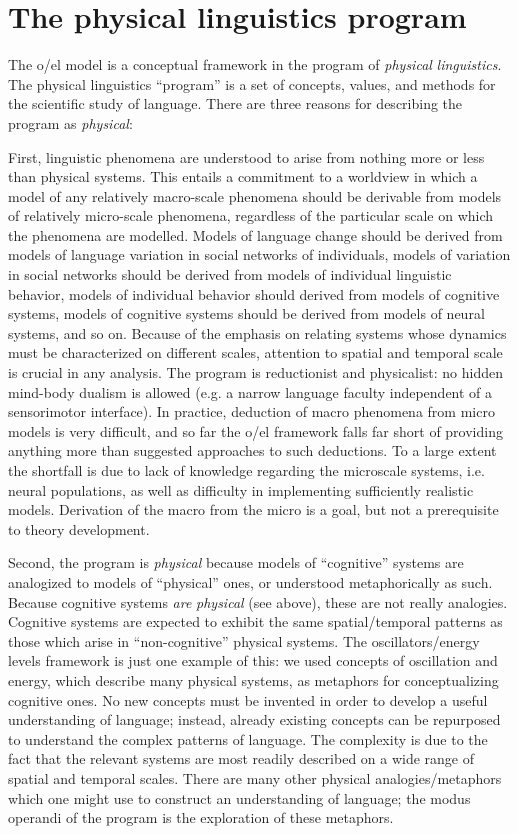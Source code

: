 \chapter{The physical linguistics program}

The o/el model is a conceptual framework in the program of \textit{physical} \textit{linguistics}. The physical linguistics “program” is a set of concepts, values, and methods for the scientific study of language. There are three reasons for describing the program as \textit{physical}: 

  First, linguistic phenomena are understood to arise from nothing more or less than physical systems. This entails a commitment to a worldview in which a model of any relatively macro-scale phenomena should be derivable from models of relatively micro-scale phenomena, regardless of the particular scale on which the phenomena are modelled. Models of language change should be derived from models of language variation in social networks of individuals, models of variation in social networks should be derived from models of individual linguistic behavior, models of individual behavior should derived from models of cognitive systems, models of cognitive systems should be derived from models of neural systems, and so on. Because of the emphasis on relating systems whose dynamics must be characterized on different scales, attention to spatial and temporal scale is crucial in any analysis. The program is reductionist and physicalist: no hidden mind-body dualism is allowed (e.g. a narrow language faculty independent of a sensorimotor interface). In practice, deduction of macro phenomena from micro models is very difficult, and so far the o/el framework falls far short of providing anything more than suggested approaches to such deductions. To a large extent the shortfall is due to lack of knowledge regarding the microscale systems, i.e. neural populations, as well as difficulty in implementing sufficiently realistic models. Derivation of the macro from the micro is a goal, but not a prerequisite to theory development.

  Second, the program is \textit{physical} because models of “cognitive” systems are analogized to models of “physical” ones, or understood metaphorically as such. Because cognitive systems \textit{are} \textit{physical} (see above), these are not really analogies. Cognitive systems are expected to exhibit the same spatial/temporal patterns as those which arise in “non-cognitive” physical systems. The oscillators/energy levels framework is just one example of this: we used concepts of oscillation and energy, which describe many physical systems, as metaphors for conceptualizing cognitive ones. No new concepts must be invented in order to develop a useful understanding of language; instead, already existing concepts can be repurposed to understand the complex patterns of language. The complexity is due to the fact that the relevant systems are most readily described on a wide range of spatial and temporal scales. There are many other physical analogies/metaphors which one might use to construct an understanding of language; the modus operandi of the program is the exploration of these metaphors.

